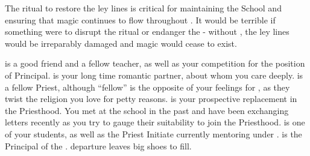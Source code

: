 \documentclass[char]{GL2020}
\begin{document}
\begin{itemz}[Notes]
	\item The ritual to restore the ley lines is critical for maintaining the School and ensuring that magic continues to flow throughout \pEarth{}.  It would be terrible if something were to disrupt the ritual or endanger the \pSc{} - without \pSc{}, the ley lines would be irreparably  damaged and magic would cease to exist.
\end{itemz}

\begin{contacts}
	\contact{\cMusic{}} is a good friend and a fellow teacher, as well as your competition for the position of Principal.
	\contact{\cJuniorStatesman{}} is your long time romantic partner, about whom you care deeply.
	\contact{\cAntiChup{}} is a fellow Priest, although “fellow” is the opposite of your feelings for \cAntiChup{\them}, as they twist the religion you love for petty reasons.
	\contact{\cHeadScientist{}} is your prospective replacement in the Priesthood. You met at the school in the past and have been exchanging letters recently as you try to gauge their suitability to join the Priesthood.
	\contact{\cScholarship{}} is one of your students, as well as the Priest Initiate currently mentoring under \cAntiChup{}.  
	\contact{\cPrincipal{}} is the Principal of the \pSchool{}. \cPrincipal{\their} departure leaves big shoes to fill.
\end{contacts}
\end{document}
